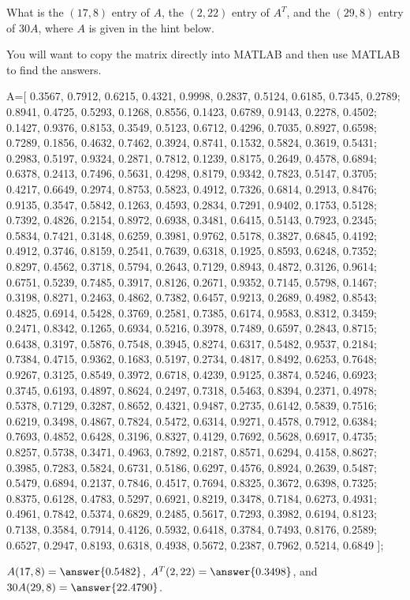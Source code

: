 \documentclass{ximera}
\begin{document}
\begin{problem}
  What is the $(17,8)$ entry of $A$, the $(2,22)$ entry of $A^T$, and the $(29,8)$ entry of $30A$, where $A$ is given in the hint below. 
  
  You will want to copy the matrix directly into MATLAB and then use MATLAB to find the answers.

  \begin{hint}

    A=[
  0.3567, 0.7912, 0.6215, 0.4321, 0.9998, 0.2837, 0.5124, 0.6185, 0.7345, 0.2789;
  0.8941, 0.4725, 0.5293, 0.1268, 0.8556, 0.1423, 0.6789, 0.9143, 0.2278, 0.4502;
  0.1427, 0.9376, 0.8153, 0.3549, 0.5123, 0.6712, 0.4296, 0.7035, 0.8927, 0.6598;
  0.7289, 0.1856, 0.4632, 0.7462, 0.3924, 0.8741, 0.1532, 0.5824, 0.3619, 0.5431;
  0.2983, 0.5197, 0.9324, 0.2871, 0.7812, 0.1239, 0.8175, 0.2649, 0.4578, 0.6894;
  0.6378, 0.2413, 0.7496, 0.5631, 0.4298, 0.8179, 0.9342, 0.7823, 0.5147, 0.3705;
  0.4217, 0.6649, 0.2974, 0.8753, 0.5823, 0.4912, 0.7326, 0.6814, 0.2913, 0.8476;
  0.9135, 0.3547, 0.5842, 0.1263, 0.4593, 0.2834, 0.7291, 0.9402, 0.1753, 0.5128;
  0.7392, 0.4826, 0.2154, 0.8972, 0.6938, 0.3481, 0.6415, 0.5143, 0.7923, 0.2345;
  0.5834, 0.7421, 0.3148, 0.6259, 0.3981, 0.9762, 0.5178, 0.3827, 0.6845, 0.4192;
  0.4912, 0.3746, 0.8159, 0.2541, 0.7639, 0.6318, 0.1925, 0.8593, 0.6248, 0.7352;
  0.8297, 0.4562, 0.3718, 0.5794, 0.2643, 0.7129, 0.8943, 0.4872, 0.3126, 0.9614;
  0.6751, 0.5239, 0.7485, 0.3917, 0.8126, 0.2671, 0.9352, 0.7145, 0.5798, 0.1467;
  0.3198, 0.8271, 0.2463, 0.4862, 0.7382, 0.6457, 0.9213, 0.2689, 0.4982, 0.8543;
  0.4825, 0.6914, 0.5428, 0.3769, 0.2581, 0.7385, 0.6174, 0.9583, 0.8312, 0.3459;
  0.2471, 0.8342, 0.1265, 0.6934, 0.5216, 0.3978, 0.7489, 0.6597, 0.2843, 0.8715;
  0.6438, 0.3197, 0.5876, 0.7548, 0.3945, 0.8274, 0.6317, 0.5482, 0.9537, 0.2184;
  0.7384, 0.4715, 0.9362, 0.1683, 0.5197, 0.2734, 0.4817, 0.8492, 0.6253, 0.7648;
  0.9267, 0.3125, 0.8549, 0.3972, 0.6718, 0.4239, 0.9125, 0.3874, 0.5246, 0.6923;
  0.3745, 0.6193, 0.4897, 0.8624, 0.2497, 0.7318, 0.5463, 0.8394, 0.2371, 0.4978;
  0.5378, 0.7129, 0.3287, 0.8652, 0.4321, 0.9487, 0.2735, 0.6142, 0.5839, 0.7516;
    0.6219, 0.3498, 0.4867, 0.7824, 0.5472, 0.6314, 0.9271, 0.4578, 0.7912, 0.6384;
    0.7693, 0.4852, 0.6428, 0.3196, 0.8327, 0.4129, 0.7692, 0.5628, 0.6917, 0.4735;
    0.8257, 0.5738, 0.3471, 0.4963, 0.7892, 0.2187, 0.8571, 0.6294, 0.4158, 0.8627;
    0.3985, 0.7283, 0.5824, 0.6731, 0.5186, 0.6297, 0.4576, 0.8924, 0.2639, 0.5487;
    0.5479, 0.6894, 0.2137, 0.7846, 0.4517, 0.7694, 0.8325, 0.3672, 0.6398, 0.7325;
    0.8375, 0.6128, 0.4783, 0.5297, 0.6921, 0.8219, 0.3478, 0.7184, 0.6273, 0.4931;
    0.4961, 0.7842, 0.5374, 0.6829, 0.2485, 0.5617, 0.7293, 0.3982, 0.6194, 0.8123;
    0.7138, 0.3584, 0.7914, 0.4126, 0.5932, 0.6418, 0.3784, 0.7493, 0.8176, 0.2589;
    0.6527, 0.2947, 0.8193, 0.6318, 0.4938, 0.5672, 0.2387, 0.7962, 0.5214, 0.6849
];

  \end{hint}

$A(17,8)=\answer{0.5482}$, $A^T(2,22)=\answer{0.3498}$, and $30A(29,8)=\answer{22.4790}$.

\end{problem}
\end{document}
